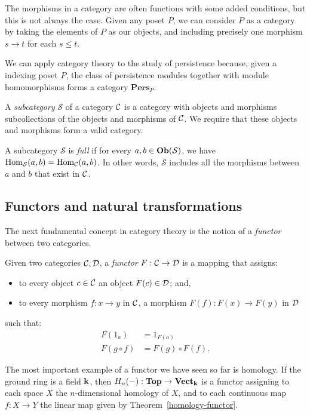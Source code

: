 The morphisms in a category are often functions with some added conditions, but this is not always the case. Given any poset $P$, we can consider $P$ as a category by taking the elements of $P$ as our objects, and including precisely one morphism $s \to t$ for each $s \leq t$.

We can apply category theory to the study of persistence because, given a indexing poset $P$, the class of persistence modules together with module homomorphisms forms a category $\mathbf{Pers}_P$. 

A \emph{subcategory} $\mathcal{S}$ of a category $\mathcal{C}$ is a category with objects and morphisms subcollections of the objects and morphisms of $\mathcal{C}$. We require that these objects and morphisms form a valid category.

A subcategory $\mathcal{S}$ is \emph{full} if for every $a, b \in \mathbf{Ob}(\mathcal{S})$, we have $\operatorname{Hom}_\mathcal{S}(a, b) = \operatorname{Hom}_{\mathcal{C}}(a, b)$. In other words, $\mathcal{S}$ includes all the morphisms between $a$ and $b$ that exist in $\mathcal{C}$.

\subsection{Functors and natural transformations}

The next fundamental concept in category theory is the notion of a \emph{functor} between two categories.

\begin{definition}
Given two categories $\mathcal{C}, \mathcal{D}$, a \emph{functor} $F : \mathcal{C} \to \mathcal{D}$ is a mapping that assigns:
\begin{itemize}
\item to every object $c \in \mathcal{C}$ an object $F(c) \in \mathcal{D}$; and,
\item to every morphism $f : x \to y$ in $\mathcal{C}$, a morphism $F(f) : F(x) \to F(y)$ in $\mathcal{D}$
\end{itemize}
such that:
\begin{align*}
F(1_a) &= 1_{F(a)} \\
F(g \circ f) &= F(g) \circ F(f).
\end{align*}
\end{definition}

The most important example of a functor we have seen so far is homology. If the ground ring is a field $\mathbf{k}$, then $H_n(-) : \mathbf{Top} \to \mathbf{Vect}_{\mathbf{k}}$ is a functor assigning to each space $X$ the $n$-dimensional homology of $X$, and to each continuous map $f : X \to Y$ the linear map given by Theorem~\ref{homology-functor}.

